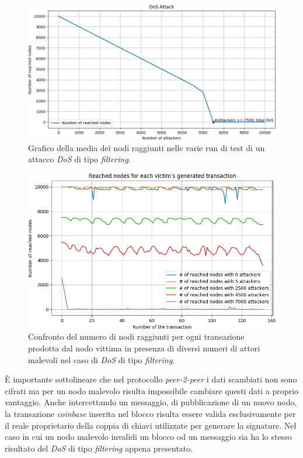 \begin{figure}[H]
    \centering
    \includegraphics[width=\textwidth]{./images/attackDOS.png}
    \caption{Grafico della media dei nodi raggiunti nelle varie run di test di un attacco \textit{DoS} di tipo \textit{filtering}.}
    \label{fig:dos}
\end{figure}
\begin{figure}[H]
    \centering
    \includegraphics[width=\textwidth]{./images/DOS-mix.png}
    \caption{Confronto del numero di nodi raggiunti per ogni transazione prodotta dal nodo vittima in presenza di diversi numeri di attori malevoli nel caso di \textit{DoS} di tipo \textit{filtering}.}
    \label{fig:dosmix}
\end{figure}
È importante sottolineare che nel protocollo \textit{peer-2-peer} i dati scambiati non sono cifrati ma per un nodo malevolo risulta impossibile cambiare questi dati a proprio vantaggio. Anche intercettando un messaggio, di pubblicazione di un nuovo nodo, la transazione \textit{coinbase} inserita nel blocco risulta essere valida esclusivamente per il reale proprietario della coppia di chiavi utilizzate per generare la signature. Nel caso in cui un nodo malevolo invalidi un blocco od un messaggio sia ha lo stesso risultato del \textit{DoS} di tipo \textit{filtering} appena presentato.\newline
